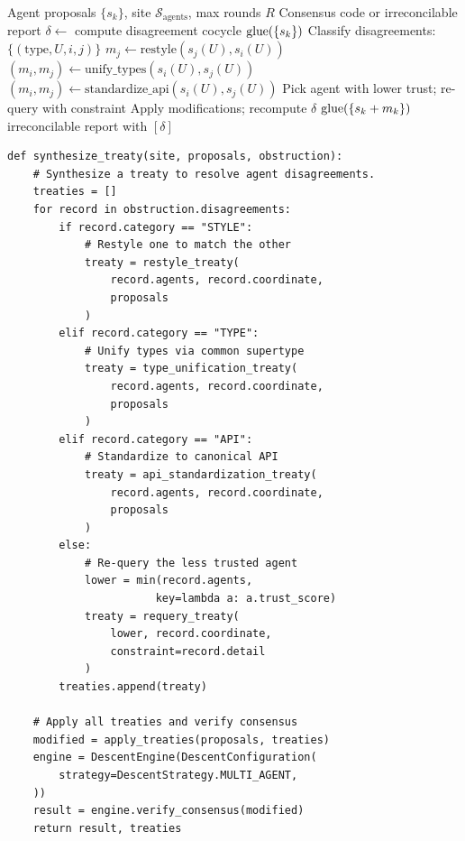 \documentclass[11pt]{article}
\newcommand{\AgentSite}{\mathcal{S}_{\mathrm{agents}}}
\begin{document}
\begin{algorithm}[H]
\caption{$\textsc{SynthesizeTreaty}$: Conflict Resolution via Descent}
\label{alg:treaty-synth}
\begin{algorithmic}[1]
\REQUIRE Agent proposals $\{s_k\}$, site $\AgentSite$, max rounds $R$
\ENSURE Consensus code or irreconcilable report
\STATE $\delta \leftarrow$ compute disagreement cocycle
  \RETURN $\mathrm{glue}(\{s_k\})$
\ENDIF
{}
  \STATE Classify disagreements: $\{(\text{type}, U, i, j)\}$
      \STATE $m_j \leftarrow \mathrm{restyle}(s_j(U), s_i(U))$
      \STATE $(m_i, m_j) \leftarrow \mathrm{unify\_types}(s_i(U), s_j(U))$
      \STATE $(m_i, m_j) \leftarrow \mathrm{standardize\_api}(s_i(U), s_j(U))$
    \ELSE
      \STATE Pick agent with lower trust; re-query with constraint
    \ENDIF
  \ENDFOR
  \STATE Apply modifications; recompute $\delta$
    \RETURN $\mathrm{glue}(\{s_k + m_k\})$
  \ENDIF
\ENDFOR
\RETURN irreconcilable report with $[\delta]$
\end{algorithmic}
\end{algorithm}

\begin{lstlisting}[style=jugeo-python,caption={Treaty synthesis implementation.}]
def synthesize_treaty(site, proposals, obstruction):
    # Synthesize a treaty to resolve agent disagreements.
    treaties = []
    for record in obstruction.disagreements:
        if record.category == "STYLE":
            # Restyle one to match the other
            treaty = restyle_treaty(
                record.agents, record.coordinate,
                proposals
            )
        elif record.category == "TYPE":
            # Unify types via common supertype
            treaty = type_unification_treaty(
                record.agents, record.coordinate,
                proposals
            )
        elif record.category == "API":
            # Standardize to canonical API
            treaty = api_standardization_treaty(
                record.agents, record.coordinate,
                proposals
            )
        else:
            # Re-query the less trusted agent
            lower = min(record.agents,
                       key=lambda a: a.trust_score)
            treaty = requery_treaty(
                lower, record.coordinate,
                constraint=record.detail
            )
        treaties.append(treaty)

    # Apply all treaties and verify consensus
    modified = apply_treaties(proposals, treaties)
    engine = DescentEngine(DescentConfiguration(
        strategy=DescentStrategy.MULTI_AGENT,
    ))
    result = engine.verify_consensus(modified)
    return result, treaties
\end{lstlisting}
\end{document}

